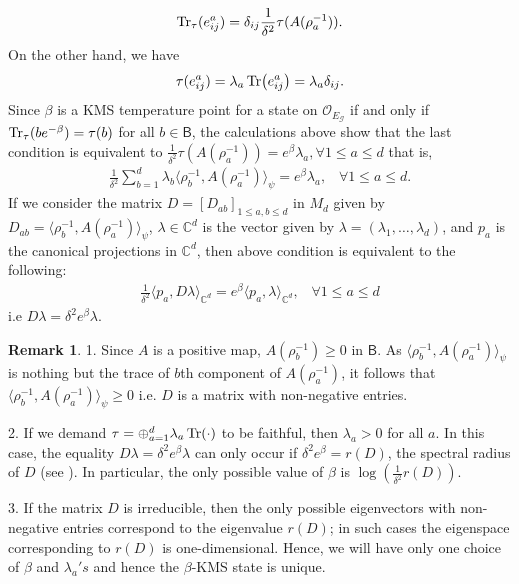 \documentclass[a4paper,reqno]{amsart}
\numberwithin{equation}{section}
\numberwithin{theorem}{section}
\theoremstyle{definition}\newtheorem{definition}[theorem]{Definition}
\theoremstyle{definition}\newtheorem{remark}[theorem]{Remark}
\theoremstyle{definition}\newtheorem{example}[theorem]{Example}
\theoremstyle{definition}\newtheorem*{notation*}{Notation}
\theoremstyle{definition}\newtheorem*{convention*}{Convention}
\theoremstyle{definition}\newtheorem{observation}{Observation}
\theoremstyle{definition}\newtheorem*{acknowledgment*}{Acknowledgments}
\newcommand{\C}{\mathbb{C}}
\newcommand{\B}{\mathsf{B}}
\newcommand{\G}{\mathcal{G}}
\begin{document}
\[\Tr_\tau(e_{ij}^a)=\delta_{ij}\frac{1}{\delta^2}\tau(A(\rho_a^{-1})).\]
On the other hand, we have
\begin{align*}
    \tau(e_{ij}^a)=\lambda_a\Tr(e_{ij}^a)=\lambda_a\delta_{ij}.
\end{align*}
  Since $\beta$ is a KMS temperature point for a state on  $\mathcal{O}_{E_\G}$ if and only if $\Tr_\tau(be^{-\beta})=\tau(b)$ for all $b\in \B$, the calculations above show that the last condition is equivalent to $\frac{1}{\delta^2}\tau(A(\rho_a^{-1}))=e^\beta\lambda_a,\forall 1\leq a\leq d$ that is,
\begin{align*}
  \frac{1}{\delta^2}\sum_{b=1}^d\lambda_b\langle\rho_b^{-1},A(\rho_a^{-1})\rangle_\psi=e^\beta\lambda_a,\;\;\;\forall 1\leq a\leq d.
\end{align*}
If we consider  the  matrix $D=[D_{ab}]_{1\leq a,b\leq d}$ in $M_d$ given by  $D_{ab}=\langle\rho_b^{-1}, A(\rho_{a}^{-1})\rangle_\psi$, $\lambda\in \C^d$ is the vector given by $\lambda=(\lambda_1,\ldots,\lambda_d)$, and $p_a$ is the canonical projections in $\C^d$, then above condition is equivalent to the following: 
\begin{align*}
     \frac{1}{\delta^2}\langle p_a, D\lambda \rangle_{\mathbb{C}^d}=e^\beta\langle p_a,\lambda\rangle_{\C^d},\;\;\;\forall1\leq a\leq d
\end{align*}
i.e $D\lambda=\delta^2e^\beta\lambda$.
\begin{remark}
 1. Since $A$ is a positive map, $A(\rho_b^{-1})\geq 0$ in $\B$.  As $\langle\rho_b^{-1},A(\rho_a^{-1})\rangle_\psi$ is nothing but the trace of $b$th component of $A(\rho_a^{-1})$, it follows that $\langle\rho_b^{-1},A(\rho_a^{-1})\rangle_\psi\geq 0$ i.e. $D$ is a matrix with non-negative entries.


2. If we demand $\tau=\oplus_{a=1}^d\lambda_a\Tr(\cdot)$ to be faithful, then $\lambda_a>0$ for all $a.$ In this case, the equality  $D\lambda=\delta^2e^\beta\lambda
$ can only occur if $\delta^2 e^\beta=r(D)$, the spectral radius of $D$ (see \cite[Corollary 8.1.30]{HJ}).  In particular, the only possible value of $\beta$ is $\log(\frac{1}{\delta^2}r(D))$. %

 3. If the matrix $D$ is irreducible, then the only possible eigenvectors with non-negative entries correspond to the eigenvalue $r(D)$; in such cases the eigenspace corresponding to $r(D)$  is one-dimensional. Hence, we will have only one choice of $\beta$ and $\lambda_a's$ and hence the $\beta$-KMS state is unique.
\end{remark}
\end{document}
